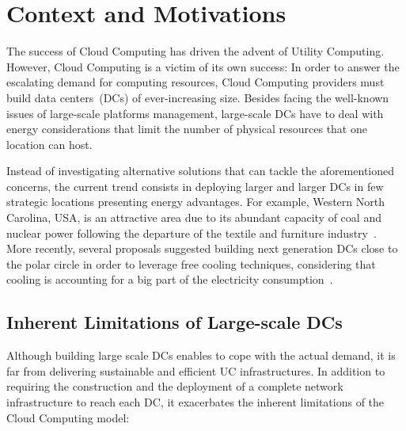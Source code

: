 \section{Context and Motivations\label{sec:intro}}

The success of Cloud Computing has driven the advent of Utility Computing. However, Cloud
Computing is a victim of its own success: In order to answer the escalating demand for
computing resources, Cloud Computing providers must build data centers~(DCs) of
ever-increasing size. Besides facing the well-known issues of large-scale platforms
management, large-scale DCs have to deal with energy considerations that limit the number
of physical resources that one location can host.

Instead of investigating alternative solutions that can tackle the aforementioned
concerns, the current trend consists in deploying larger and larger DCs in few strategic
locations presenting energy advantages. For example, Western North Carolina, USA, is an
attractive area due to its abundant capacity of coal and nuclear power following the
departure of the textile and furniture industry~\cite{greenpeace:2013}. More recently,
several proposals suggested building next generation DCs close to the polar circle in
order to leverage free cooling techniques, considering that cooling is accounting for a
big part of the electricity consumption~\cite{greenberg:sigcomm09}.

\subsection{Inherent Limitations of Large-scale DCs}

Although building large scale DCs  enables to cope with the actual demand,
it is far from delivering sustainable and efficient UC infrastructures. In addition to
requiring the construction and the deployment of a complete network infrastructure to
reach each DC, it exacerbates the inherent limitations of the Cloud Computing model:

